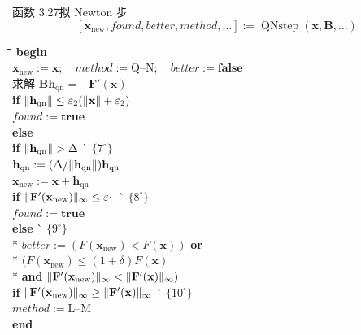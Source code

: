 \begin{statement}{函数 3.27\quad 拟 Newton 步}
\label{fn:3.27}
\small
\[
  [\mathbf{x}_{\mathrm{new}},\mathit{found},\mathit{better},\mathit{method},\ldots]
       :=\operatorname{QNstep}(\mathbf{x},\mathbf{B},\ldots)
\]
\begin{tabbing}
\quad\=\quad\=\quad\=\quad\=\quad\=\kill
\textbf{begin}\\
\> $\mathbf{x}_{\mathrm{new}}:=\mathbf{x};\quad\mathit{method}:=\text{Q--N};\quad
       \mathit{better}:=\textbf{false}$\\
\> 求解 $\mathbf{B}\mathbf{h}_{\mathrm{qn}}=-\mathbf{F}'(\mathbf{x})$\\
\> \textbf{if} $\lVert\mathbf{h}_{\mathrm{qn}}\rVert\le\varepsilon_2(\lVert\mathbf{x}\rVert+\varepsilon_2)$\\
\>\> $\mathit{found}:=\textbf{true}$\\
\> \textbf{else}\\
\>\> \textbf{if} $\lVert\mathbf{h}_{\mathrm{qn}}\rVert>\Delta$ \` $\{7^{\circ}\}$\\
\>\>\> $\mathbf{h}_{\mathrm{qn}}:=(\Delta/\lVert\mathbf{h}_{\mathrm{qn}}\rVert)\mathbf{h}_{\mathrm{qn}}$\\
\>\> $\mathbf{x}_{\mathrm{new}}:=\mathbf{x}+\mathbf{h}_{\mathrm{qn}}$\\
\>\> \textbf{if} $\lVert\mathbf{F}'(\mathbf{x}_{\mathrm{new}})\rVert_{\infty}\le\varepsilon_1$
       \` $\{8^{\circ}\}$\\
\>\>\> $\mathit{found}:=\textbf{true}$\\
\>\> \textbf{else} \` $\{9^{\circ}\}$\\*
\>\>\> $\mathit{better}:=(F(\mathbf{x}_{\mathrm{new}})<F(\mathbf{x}))$ \textbf{or}\\*
\>\>\>\> $(F(\mathbf{x}_{\mathrm{new}})\le(1+\delta)F(\mathbf{x})$\\*
\>\>\>\> \textbf{and} $\lVert\mathbf{F}'(\mathbf{x}_{\mathrm{new}})\rVert_{\infty}<\lVert\mathbf{F}'(\mathbf{x})\rVert_{\infty})$\\
\>\>\> \textbf{if} $\lVert\mathbf{F}'(\mathbf{x}_{\mathrm{new}})\rVert_{\infty}\ge\lVert\mathbf{F}'(\mathbf{x})\rVert_{\infty}$
         \` $\{10^{\circ}\}$\\
\>\>\>\> $\mathit{method}:=\text{L--M}$\\
\textbf{end}
\end{tabbing}
\end{statement}

